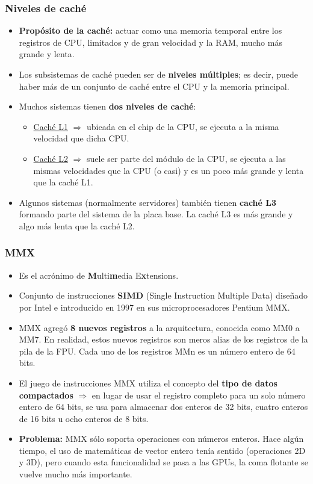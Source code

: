 \frame
{
\frametitle{Niveles de caché}
\begin{itemize}
 \item \textbf{Propósito de la caché:} actuar como una memoria temporal entre los registros de CPU, limitados y de gran velocidad y la RAM, mucho más grande y lenta.
 \item Los subsistemas de caché pueden ser de \textbf{niveles múltiples}; es decir, puede haber más de un conjunto de caché entre el CPU y la memoria principal. 
 \item Muchos sistemas tienen \textbf{dos niveles de caché}:
	\begin{itemize}
	\item \underline{Caché L1}  $\Rightarrow$ ubicada en el chip de la CPU, se ejecuta a la misma velocidad que dicha CPU.
	\item \underline{Caché L2} $\Rightarrow$ suele ser parte del módulo de la CPU, se ejecuta a las mismas velocidades que la CPU (o casi) y es un poco más grande y lenta que la caché L1.
	\end{itemize}
 \item Algunos sistemas (normalmente servidores) también tienen \textbf{caché L3} formando parte del sistema de la placa base. La caché L3 es más grande y  algo más lenta que la caché L2.
\end{itemize}
}

\frame
{
\frametitle{MMX}
\begin{itemize}
 \item Es el acrónimo de \textbf{M}ulti\textbf{m}edia E\textbf{x}tensions.
 \item Conjunto de instrucciones \textbf{SIMD} (Single Instruction Multiple Data) diseñado por Intel e introducido en 1997 en sus microprocesadores Pentium MMX.
 \item MMX agregó \textbf{8 nuevos registros} a la arquitectura, conocida como MM0 a MM7. En realidad, estos nuevos registros son meros alias de los registros de la pila de la FPU. Cada uno de los registros MMn es un número entero de 64 bits.
 \item El juego de instrucciones MMX utiliza el concepto del \textbf{tipo de datos compactados} $\Rightarrow$ en lugar de usar el registro completo para un solo número entero de 64 bits, se usa para almacenar dos enteros de 32 bits, cuatro enteros de 16 bits u ocho enteros de 8 bits.
 \item \textbf{Problema:} MMX sólo soporta operaciones con números enteros. Hace algún tiempo, el uso de matemáticas de vector entero tenía sentido (operaciones 2D y 3D), pero cuando esta funcionalidad se pasa a las GPUs, la coma flotante se vuelve mucho más importante.
 \end{itemize}
}

